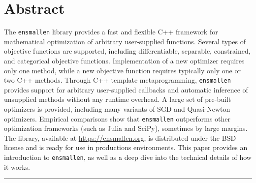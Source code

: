 \documentclass[10pt]{article}
\begin{document}

\begin{center}
{\Large\doctitle}
\end{center}
\vspace{1ex}
\begin{center}
{\docauthor}
\end{center}

\vspace{5ex} %

\section*{Abstract}
The {\tt ensmallen} library provides a fast and flexible C++ framework
for mathematical optimization of arbitrary user-supplied functions.
Several types of objective functions are supported, including differentiable,
separable, constrained, and categorical objective functions.
Implementation of a new optimizer requires only one method,
while a new objective function requires typically only one or two C++ methods.
Through C++ template metaprogramming, {\tt ensmallen} provides support for arbitrary
user-supplied callbacks and automatic inference of unsupplied methods without
any runtime overhead.
A large set of pre-built optimizers is provided,
including many variants of SGD and Quasi-Newton optimizers.
Empirical comparisons show that {\tt ensmallen}
outperforms other optimization frameworks (such as Julia and SciPy), sometimes
by large margins.  The library, available at \url{https://ensmallen.org}, is
distributed under the BSD license and is ready for use in productions
environments.  This paper provides an introduction to {\tt ensmallen}, as well
as a deep dive into the technical details of how it works.

\vspace{4ex}
\hrule













\clearpage



\end{document}
